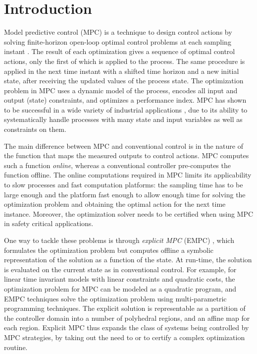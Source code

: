 \section{Introduction}

Model predictive control (MPC) is a technique to design control actions by solving finite-horizon open-loop
optimal control problems at each sampling instant \cite{RMD17}.
The result of each optimization gives a sequence of optimal control actions, only the first of which is applied
to the process.
The same procedure is applied in the next time instant with a shifted time horizon and a new initial state, 
after receiving the updated values of the process state.
The optimization problem in MPC uses a dynamic model of the process, encodes all input and output (state) constraints, and 
optimizes a performance index. 
MPC has shown to be successful in a wide variety of industrial applications \cite{QinBadgwell03}, due to its 
ability to systematically handle processes with many state and input variables as well as constraints on them. 

The main difference between MPC and conventional control is in the nature of the function that maps the measured outputs to control actions. 
MPC computes such a function \emph{online}, whereas a conventional controller pre-computes the function offline.
The online computations required in MPC limits its applicability to slow processes and fast computation platforms: 
the sampling time has to be large enough and the platform fast enough to allow enough time for solving the optimization problem
and obtaining the optimal action for the next time instance. 
Moreover, the optimization solver needs to be certified when using MPC in safety critical applications.

One way to tackle these problems is through \emph{explicit MPC} (EMPC) \cite{Bemporad:2002,Alessio2009}, which formulates the optimization
problem but computes offline a symbolic representation of the solution as a function of the state.
At run-time, the solution is evaluated on the current state as in conventional control.
For example, for linear time invariant models with linear constraints and quadratic costs, the optimization
problem for MPC can be modeled as a quadratic program, and EMPC techniques solve the optimization problem
using multi-parametric programming techniques.
The explicit solution is representable as a partition of the controller domain into a number of polyhedral regions,
and an affine map for each region. 
Explicit MPC thus expands the class of systems being controlled by MPC strategies, by taking out the need to 
or to certify a complex optimization routine.

